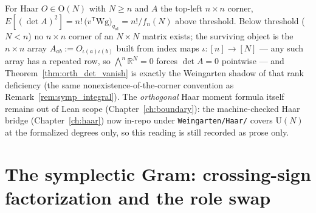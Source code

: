 \begin{remark}\label{rem:orth_integral}
For Haar $O\in\mathrm O(N)$ with $N\ge n$ and $A$ the top-left
$n\times n$ corner,
$E[(\det A)^2] = n!\,\bigl(v^{\mathsf T}\mathrm{Wg}\bigr)_{q_{\mathrm{id}}}
= n!/f_n(N)$ above threshold. Below threshold ($N<n$) no $n\times n$
corner of an $N\times N$ matrix exists; the surviving object is the
$n\times n$ array $A_{ab}:=O_{\iota(a)\iota(b)}$ built from index maps
$\iota:[n]\to[N]$ --- any such array has a repeated row, so
$\bigwedge^n\mathbb R^N=0$ forces $\det A=0$ pointwise --- and
Theorem~\ref{thm:orth_det_vanish} is exactly the Weingarten shadow of that
rank deficiency (the same nonexistence-of-the-corner convention as
Remark~\ref{rem:symp_integral}). The \emph{orthogonal} Haar moment formula itself remains out
of Lean scope (Chapter~\ref{ch:boundary}): the machine-checked Haar
bridge (Chapter~\ref{ch:haar}) now
in-repo under \texttt{Weingarten/Haar/} covers $\mathrm U(N)$ at the formalized
degrees only, so this reading is still recorded as prose only.
\end{remark}

\chapter{The symplectic Gram: crossing-sign factorization and the role swap}\label{ch:symplectic}

